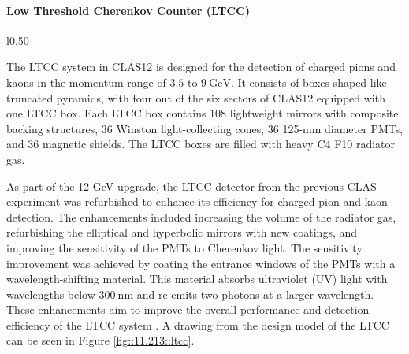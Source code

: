 \paragraph{Low Threshold Cherenkov Counter (LTCC)}
    \begin{wrapfigure}{l}{0.50\textwidth}
        \centering{}
        \caption[LTCC Mirror System]{Layout and components of the optical mirror system within each LTCC box from the design model.
        Source: \href{https://jlab.org/physics/hall-b/clas12}{CLAS12 wiki}.}
        \label{fig::11.213::ltcc}
    \end{wrapfigure}

    The LTCC system in CLAS12 is designed for the detection of charged pions and kaons in the momentum range of $3.5$ to $9 ~\text{GeV}$.
    It consists of boxes shaped like truncated pyramids, with four out of the six sectors of CLAS12 equipped with one LTCC box.
    Each LTCC box contains 108 lightweight mirrors with composite backing structures, 36 Winston light-collecting cones, 36 125-mm diameter PMTs, and 36 magnetic shields.
    The LTCC boxes are filled with heavy C4 F10 radiator gas.

    As part of the 12 GeV upgrade, the LTCC detector from the previous CLAS experiment was refurbished to enhance its efficiency for charged pion and kaon detection.
    The enhancements included increasing the volume of the radiator gas, refurbishing the elliptical and hyperbolic mirrors with new coatings, and improving the sensitivity of the PMTs to Cherenkov light.
    The sensitivity improvement was achieved by coating the entrance windows of the PMTs with a wavelength-shifting material.
    This material absorbs ultraviolet (UV) light with wavelengths below $300 ~\text{nm}$ and re-emits two photons at a larger wavelength.
    These enhancements aim to improve the overall performance and detection efficiency of the LTCC system \cite{ungaro2020}.
    A drawing from the design model of the LTCC can be seen in Figure \ref{fig::11.213::ltcc}.
